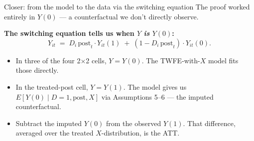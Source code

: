 \documentclass[aspectratio=169,11pt]{beamer}
\begin{document}
\begin{frame}{Closer: from the model to the data via the switching equation}
\footnotesize
The proof worked entirely in $Y(0)$ --- a counterfactual we don't directly observe.

\vspace{0.5em}
\textbf{The switching equation tells us when $Y$ \textit{is} $Y(0)$:}
\[
Y_{it} \;=\; D_i\,\text{post}_t \cdot Y_{it}(1) \;+\; (1 - D_i\,\text{post}_t) \cdot Y_{it}(0).
\]

\vspace{0.4em}
\begin{itemize}\setlength\itemsep{3pt}
  \item In three of the four 2$\times$2 cells, $Y = Y(0)$. \;The TWFE-with-$X$ model fits those directly.
  \item In the treated-post cell, $Y = Y(1)$. \;The model gives us $E[Y(0) \mid D{=}1, \text{post}, X]$ via Assumptions 5--6 --- the imputed counterfactual.
  \item Subtract the imputed $Y(0)$ from the observed $Y(1)$. \;That difference, averaged over the treated $X$-distribution, is the ATT.
\end{itemize}

\vspace{0.3em}
\end{frame}

\end{document}
